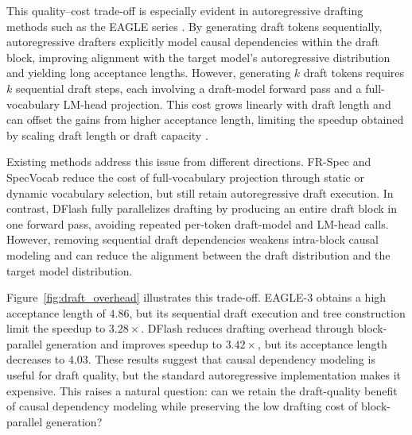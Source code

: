 \documentclass{llmxive}
\begin{document}
This quality--cost trade-off is especially evident in autoregressive drafting methods such as the EAGLE series \citep{li2024eagle, li2024eagle2, li2025eagle3}. By generating draft tokens sequentially, autoregressive drafters explicitly model causal dependencies within the draft block, improving alignment with the target model's autoregressive distribution and yielding long acceptance lengths. However, generating \(k\) draft tokens requires \(k\) sequential draft steps, each involving a draft-model forward pass and a full-vocabulary LM-head projection. This cost grows linearly with draft length and can offset the gains from higher acceptance length, limiting the speedup obtained by scaling draft length or draft capacity \citep{zhao2025fr,yan2025scaling}.






Existing methods address this issue from different directions. FR-Spec \citep{zhao2025fr} and SpecVocab \citep{williams2026speculative} reduce the cost of full-vocabulary projection through static or dynamic vocabulary selection, but still retain autoregressive draft execution. In contrast, DFlash \citep{chen2026dflash} fully parallelizes drafting by producing an entire draft block in one forward pass, avoiding repeated per-token draft-model and LM-head calls. However, removing sequential draft dependencies weakens intra-block causal modeling and can reduce the alignment between the draft distribution and the target model distribution.

Figure~\ref{fig:draft_overhead} illustrates this trade-off. 
EAGLE-3 obtains a high acceptance length of \(4.86\), but its sequential draft execution and tree construction limit the speedup to \(3.28\times\). 
DFlash reduces drafting overhead through block-parallel generation and improves speedup to \(3.42\times\), but its acceptance length decreases to \(4.03\). 
These results suggest that causal dependency modeling is useful for draft quality, but the standard autoregressive implementation makes it expensive. 
This raises a natural question: can we retain the draft-quality benefit of causal dependency modeling while preserving the low drafting cost of block-parallel generation?
\end{document}
